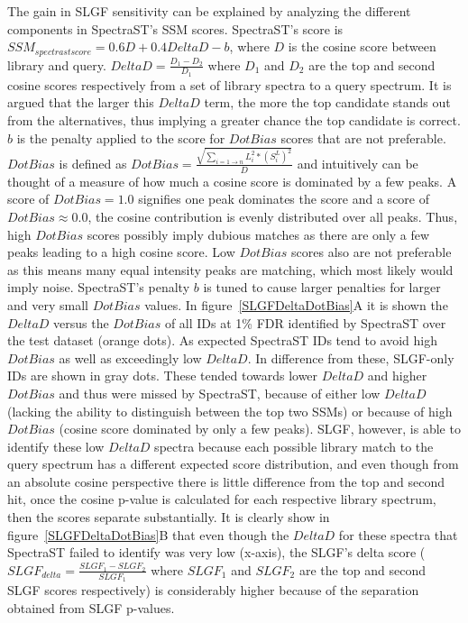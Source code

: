 \documentclass[endnotes,11pt]{article}
\begin{document}
 The gain in SLGF sensitivity can be explained by analyzing the different components in SpectraST's SSM scores. SpectraST's score is $SSM_{spectrast score} = 0.6D + 0.4DeltaD - b$, where $D$ is the cosine score between library and query. $DeltaD = \frac{D_1 - D_2}{D_1}$ where $D_1$ and $D_2$ are the top and second cosine scores respectively from a set of library spectra to a query spectrum. It is argued that the larger this $DeltaD$ term, the more the top candidate stands out from the alternatives, thus implying a greater chance the top candidate is correct. $b$ is the penalty applied to the score for $DotBias$ scores that are not preferable. $DotBias$ is defined as $DotBias = \frac{\sqrt{\sum_{i=1 \rightarrow n}{L_i^2 * (S^L_i)^2} }} {D}$ and intuitively can be thought of a measure of how much a cosine score is dominated by a few peaks. A score of $DotBias=1.0$ signifies one peak dominates the score and a score of $DotBias\approx0.0$, the cosine contribution is evenly distributed over all peaks. Thus, high $DotBias$ scores possibly imply dubious matches as there are only a few peaks leading to a high cosine score. Low $DotBias$ scores also are not preferable as this means many equal intensity peaks are matching, which most likely would imply noise. SpectraST's penalty $b$ is tuned to cause larger penalties for larger and very small $DotBias$ values. In figure~\ref{SLGFDeltaDotBias}A it is shown the $DeltaD$ versus the $DotBias$ of all IDs at 1\% FDR identified by SpectraST over the test dataset (orange dots). As expected SpectraST IDs tend to avoid high $DotBias$ as well as exceedingly low $DeltaD$. In difference from these, SLGF-only IDs are shown in gray dots. These tended towards lower $DeltaD$ and higher $DotBias$ and thus were missed by SpectraST, because of either low $DeltaD$ (lacking the ability to distinguish between the top two SSMs) or because of high $DotBias$ (cosine score dominated by only a few peaks). SLGF, however, is able to identify these low $DeltaD$ spectra because each possible library match to the query spectrum has a different expected score distribution, and even though from an absolute cosine perspective there is little difference from the top and second hit, once the cosine p-value is calculated for each respective library spectrum, then the scores separate substantially. It is clearly show in figure~\ref{SLGFDeltaDotBias}B that even though the $DeltaD$ for these spectra that SpectraST failed to identify was very low (x-axis), the SLGF's delta score ($SLGF_{delta} = \frac{SLGF_1 - SLGF_2}{SLGF_1}$ where $SLGF_1$ and $SLGF_2$ are the top and second SLGF scores respectively) is considerably higher because of the separation obtained from SLGF p-values.
\end{document}
